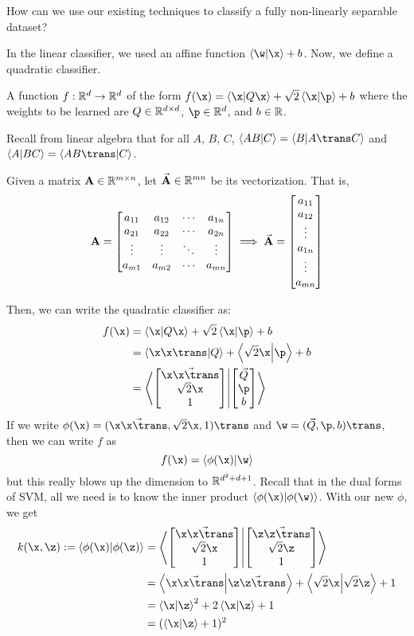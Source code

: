 \documentclass[class=cs480,notes,tikz]{agony}
\begin{document}
\begin{problem}
  How can we use our existing techniques to classify
  a fully non-linearly separable dataset?
\end{problem}

In the linear classifier, we used an affine function $\ip{\w}{\x}+b$.
Now, we define a quadratic classifier.

\begin{defn}
  A function $f : \mathbb{R}^d \to \mathbb{R}^d$ of the form $f(\x) = \ip{\x}{Q\x} + \sqrt{2}\ip{\x}{\p} + b$
  where the weights to be learned are $Q \in \mathbb{R}^{d\times d}$, $\p \in \R^d$, and $b \in \mathbb{R}$.
\end{defn}

Recall from linear algebra that for all $A$, $B$, $C$, $\ip{AB}{C} = \ip{B}{A\trans C}$
and $\ip{A}{BC} = \ip{AB\trans}{C}$.

\begin{defn}
  Given a matrix $\vb{A} \in \mathbb{R}^{m\times n}$,
  let $\vec{\vb{A}} \in \mathbb{R}^{mn}$ be its vectorization.
  That is,
  \[
    \vb A = \mqty[a_{11} & a_{12} & \cdots & a_{1n} \\ a_{21} & a_{22} & \cdots & a_{2n} \\ \vdots & \vdots & \ddots & \vdots \\ a_{m1} & a_{m2} & \cdots & a_{mn}]
    \implies
    \vec{\vb A} = \mqty[a_{11} \\ a_{12} \\ \vdots \\ a_{1n} \\ \vdots \\ a_{mn}]
  \]
\end{defn}

Then, we can write the quadratic classifier as:
\begin{align*}
  f(\x) & =  \ip{\x}{Q\x} + \sqrt{2}\ip{\x}{\p} + b       \\
        & =  \ip{\x\x\trans}{Q} + \ip{\sqrt{2}\x}{\p} + b \\
        & = \ip{\phix{\x}}{\bmqty{\vec{Q}                 \\\p\\b}}
\end{align*}
If we write $\phi(\x) = (\vec{\x\x\trans}, \sqrt{2}\x, 1)\trans$
and $\w = (\vec{Q}, \p, b)\trans$,
then we can write $f$ as
\[ f(\x) = \ip{\phi(\x)}{\w} \]
but this really blows up the dimension to $\mathbb{R}^{d^2+d+1}$.
Recall that in the dual forms of SVM,
all we need is to know the inner product $\ip{\phi(\x)}{\phi(\w)}$.
With our new $\phi$, we get
\begin{align*}
  k(\x,\z) := \ip{\phi(\x)}{\phi(\z)}
   & = \ip{\phix{\x}}{\phix{\z}}                                             \\
   & = \ip{\vec{\x\x\trans}}{\vec{\z\z\trans}} + \ip{\sqrt2\x}{\sqrt2\z} + 1 \\
   & = \ip{\x}{\z}^2 + 2\ip{\x}{\z} + 1                                      \\
   & = (\ip{\x}{\z} + 1)^2
\end{align*}
\end{document}
